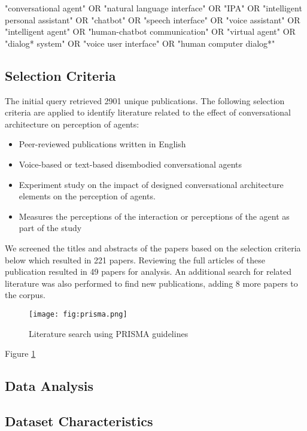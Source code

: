 \documentclass[sigconf,screen,review, anonymous]{acmart}
\begin{document}
\begin{mdframed}
"conversational agent" OR "natural language interface" OR "IPA" OR "intelligent personal assistant" OR "chatbot" OR "speech interface" OR "voice assistant" OR "intelligent agent" OR "human-chatbot communication" OR "virtual agent" OR "dialog* system" OR "voice user interface" OR "human computer dialog*"
\end{mdframed}

\subsection{Selection Criteria}
The initial query retrieved 2901 unique publications. The following selection criteria are applied to identify literature related to the effect of conversational architecture on perception of agents:
\begin{itemize}
  \item Peer-reviewed publications written in English
  \item Voice-based or text-based disembodied conversational agents
  \item Experiment study on the impact of designed conversational architecture elements on the perception of agents.
  \item Measures the perceptions of the interaction or perceptions of the agent as part of the study
\end{itemize}

We screened the titles and abstracts of the papers based on the selection criteria below which resulted in 221 papers. Reviewing the full articles of these publication resulted in 49 papers for analysis. An additional search for related literature was also performed to find new publications, adding 8 more papers to the corpus.

\begin{figure}[h]
  \centering
  \texttt{[image: fig:prisma.png]}
  \caption{Literature search using PRISMA guidelines}
  \label{fig:prisma}
\end{figure}

Figure \ref{fig:prisma}

\subsection{Data Analysis}



\subsection{Dataset Characteristics}
\end{document}
